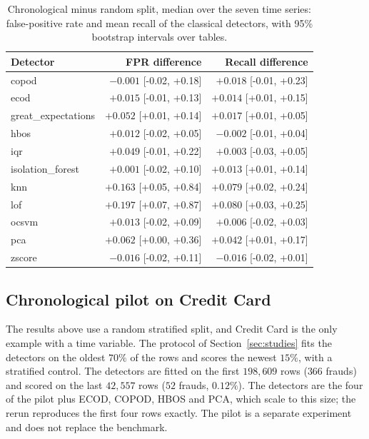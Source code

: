 \documentclass[conference]{IEEEtran}
\begin{document}
\begin{table}[t]
\caption{Chronological minus random split, median over the seven time series: false-positive rate and mean recall of the classical detectors, with 95\% bootstrap intervals over tables.}
\label{tab:chrono-injected}
\centering
\scriptsize
\begin{tabular}{lrr}
\toprule
Detector & FPR difference & Recall difference \\
\midrule
copod & $-0.001$ [-0.02, +0.18] & $+0.018$ [-0.01, +0.23] \\
ecod & $+0.015$ [-0.01, +0.13] & $+0.014$ [+0.01, +0.15] \\
great\_expectations & $+0.052$ [+0.01, +0.14] & $+0.017$ [+0.01, +0.05] \\
hbos & $+0.012$ [-0.02, +0.05] & $-0.002$ [-0.01, +0.04] \\
iqr & $+0.049$ [-0.01, +0.22] & $+0.003$ [-0.03, +0.05] \\
isolation\_forest & $+0.001$ [-0.02, +0.10] & $+0.013$ [+0.01, +0.14] \\
knn & $+0.163$ [+0.05, +0.84] & $+0.079$ [+0.02, +0.24] \\
lof & $+0.197$ [+0.07, +0.87] & $+0.080$ [+0.03, +0.25] \\
ocsvm & $+0.013$ [-0.02, +0.09] & $+0.006$ [-0.02, +0.03] \\
pca & $+0.062$ [+0.00, +0.36] & $+0.042$ [+0.01, +0.17] \\
zscore & $-0.016$ [-0.02, +0.11] & $-0.016$ [-0.02, +0.01] \\
\bottomrule
\end{tabular}
\end{table}

\subsection{Chronological pilot on Credit Card}
\label{sec:chrono}
The results above use a random stratified split, and Credit Card is the only example
with a time variable. The protocol of Section~\ref{sec:studies} fits the detectors on the
oldest $70\%$ of the rows and scores the newest $15\%$, with a stratified control.
The detectors are fitted on the first $198{,}609$ rows ($366$ frauds) and scored on the last
$42{,}557$ rows ($52$ frauds, $0.12\%$). The detectors are the four of the pilot plus ECOD,
COPOD, HBOS and PCA, which scale to this size; the rerun reproduces the first four rows
exactly. The pilot is a separate experiment and does not replace the benchmark.
\end{document}
